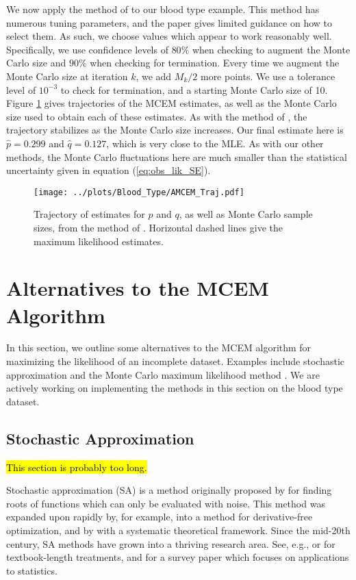 \documentclass[11pt, oneside]{article}   	%
\begin{document}
We now apply the method of \citeauthor{Caf05} to our blood type example. This method has numerous tuning parameters, and the paper gives limited guidance on how to select them. As such, we choose values which appear to work reasonably well. Specifically, we use confidence levels of $80\%$ when checking to augment the Monte Carlo size and $90\%$ when checking for termination. Every time we augment the Monte Carlo size at iteration $k$, we add $M_k/2$ more points. We use a tolerance level of $10^{-3}$ to check for termination, and a starting Monte Carlo size of 10. Figure \ref{fig:blood_AMCEM_traj} gives trajectories of the MCEM estimates, as well as the Monte Carlo size used to obtain each of these estimates. As with the method of \citet{Boo99}, the trajectory stabilizes as the Monte Carlo size increases. Our final estimate here is $\hat{p} = 0.299$ and $\hat{q} = 0.127$, which is very close to the MLE. As with our other methods, the Monte Carlo fluctuations here are much smaller than the statistical uncertainty given in equation (\ref{eq:obs_lik_SE}).

\begin{figure}
    \centering
    \caption{Trajectory of estimates for $p$ and $q$, as well as Monte Carlo sample sizes, from the method of \citeauthor{Caf05}. Horizontal dashed lines give the maximum likelihood estimates.}
    \label{fig:blood_AMCEM_traj}
    \texttt{[image: ../plots/Blood\_Type/AMCEM\_Traj.pdf]}   
\end{figure}

\section{Alternatives to the MCEM Algorithm}
\label{sec:alternatives}

In this section, we outline some alternatives to the MCEM algorithm for maximizing the likelihood of an incomplete dataset. Examples include stochastic approximation \citep{Rob51, Lai03} and the Monte Carlo maximum likelihood method \citep{Gel93, Gey94}. We are actively working on implementing the methods in this section on the blood type dataset.


\subsection{Stochastic Approximation}
\label{sec:SAEM}

\hl{This section is probably too long.}

Stochastic approximation (SA) is a method originally proposed by \citet{Rob51} for finding roots of functions which can only be evaluated with noise. This method was expanded upon rapidly by, for example, \citet{Kie52} into a method for derivative-free optimization, and by \citet{Dvo56} with a systematic theoretical framework. Since the mid-20th century, SA methods have grown into a thriving research area. See, e.g., \citet{Kus97} or \citet{Bor22} for textbook-length treatments, and \citet{Lai03} for a survey paper which focuses on applications to statistics.
\end{document}

